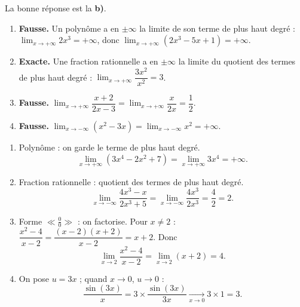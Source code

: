 \documentclass[11pt]{article}
\begin{document}
\begin{exoresolu}
La bonne réponse est la \textbf{b)}.
\begin{enumerate}
\item \textbf{Fausse.} Un polynôme a en $\pm\infty$ la limite de son terme de plus haut degré : $\lim_{x\to +\infty} 2x^3 = +\infty$, donc $\lim_{x\to +\infty}(2x^3-5x+1)=+\infty$.
\item \textbf{Exacte.} Une fraction rationnelle a en $\pm\infty$ la limite du quotient des termes de plus haut degré : $\lim_{x\to +\infty}\dfrac{3x^2}{x^2}=3$.
\item \textbf{Fausse.} $\lim_{x\to +\infty}\dfrac{x+2}{2x-3}=\lim_{x\to +\infty}\dfrac{x}{2x}=\dfrac{1}{2}$.
\item \textbf{Fausse.} $\lim_{x\to -\infty}(x^2-3x)=\lim_{x\to -\infty}x^2=+\infty$.
\end{enumerate}
\end{exoresolu}

\begin{exoresolu}
\begin{enumerate}
\item Polynôme : on garde le terme de plus haut degré.
\[\lim_{x\to +\infty}(3x^4-2x^2+7)=\lim_{x\to +\infty}3x^4=+\infty.\]
\item Fraction rationnelle : quotient des termes de plus haut degré.
\[\lim_{x\to -\infty}\frac{4x^3-x}{2x^3+5}=\lim_{x\to -\infty}\frac{4x^3}{2x^3}=\frac{4}{2}=2.\]
\item Forme $\ll\frac{0}{0}\gg$ : on factorise. Pour $x\neq 2$ : $\dfrac{x^2-4}{x-2}=\dfrac{(x-2)(x+2)}{x-2}=x+2$. Donc
\[\lim_{x\to 2}\frac{x^2-4}{x-2}=\lim_{x\to 2}(x+2)=4.\]
\item On pose $u=3x$ ; quand $x\to 0$, $u\to 0$ :
\[\frac{\sin(3x)}{x}=3\times\frac{\sin(3x)}{3x}\xrightarrow[x\to 0]{}3\times 1=3.\]
\end{enumerate}
\end{exoresolu}
\end{document}
